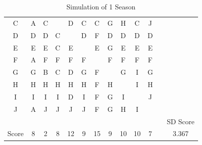 \documentclass[12pt]{article}
\begin{document}
\begin{table}[h]
\begin{tabular}{ccccccccccccc}
C     & A     & C     &       & D     & C     & C     & G     & H     & C     & J     &  &          \\
D     & D     & D     & C     &       & D     & F     & D     & D     & D     & D     &  &          \\
E     & E     & E     & C     & E     &       & E     & G     & E     & E     & E     &  &          \\
F     & A     & F     & F     & F     & F     &       & F     & F     & F     & F     &  &          \\
G     & G     & B     & C     & D     & G     & F     &       & G     & I     & G     &  &          \\
H     & H     & H     & H     & H     & H     & F     & H     &       & I     & H     &  &          \\
I     & I     & I     & I     & D     & I     & F     & G     & I     &       & J     &  &          \\
J     & A     & J     & J     & J     & J     & F     & G     & H     & I     &       &  &          \\
      &       &       &       &       &       &       &       &       &       &       &  & SD Score \\
Score & 8     & 2     & 8     & 12    & 9     & 15    & 9     & 10    & 10    & 7     &  & 3.367   
\end{tabular}
\caption{Simulation of 1 Season}
\end{table}
\end{document}
